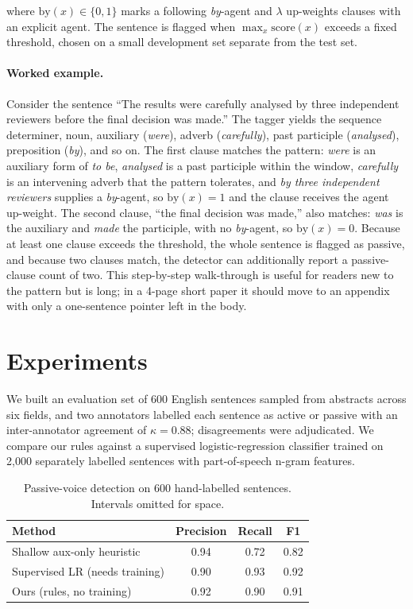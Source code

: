 \documentclass[11pt]{article}
\begin{document}
where $\mathrm{by}(x)\in\{0,1\}$ marks a following \emph{by}-agent and $\lambda$
up-weights clauses with an explicit agent. The sentence is flagged when
$\max_x \mathrm{score}(x)$ exceeds a fixed threshold, chosen on a small
development set separate from the test set.

\paragraph{Worked example.}
Consider the sentence ``The results were carefully analysed by three independent
reviewers before the final decision was made.'' The tagger yields the sequence
determiner, noun, auxiliary (\emph{were}), adverb (\emph{carefully}), past
participle (\emph{analysed}), preposition (\emph{by}), and so on. The first
clause matches the pattern: \emph{were} is an auxiliary form of \emph{to be},
\emph{analysed} is a past participle within the window, \emph{carefully} is an
intervening adverb that the pattern tolerates, and \emph{by three independent
reviewers} supplies a \emph{by}-agent, so $\mathrm{by}(x)=1$ and the clause
receives the agent up-weight. The second clause, ``the final decision was
made,'' also matches: \emph{was} is the auxiliary and \emph{made} the participle,
with no \emph{by}-agent, so $\mathrm{by}(x)=0$. Because at least one clause
exceeds the threshold, the whole sentence is flagged as passive, and because two
clauses match, the detector can additionally report a passive-clause count of
two. This step-by-step walk-through is useful for readers new to the pattern but
is long; in a 4-page short paper it should move to an appendix with only a
one-sentence pointer left in the body.

\section{Experiments}

We built an evaluation set of 600 English sentences sampled from abstracts across
six fields, and two annotators labelled each sentence as active or passive with
an inter-annotator agreement of $\kappa = 0.88$; disagreements were adjudicated.
We compare our rules against a supervised logistic-regression classifier trained
on 2{,}000 separately labelled sentences with part-of-speech n-gram features.

\begin{table}[t]
    \centering
    \begin{tabular}{lccc}
        \toprule
        Method & Precision & Recall & F1 \\
        \midrule
        Shallow aux-only heuristic & 0.94 & 0.72 & 0.82 \\
        Supervised LR (needs training) & 0.90 & 0.93 & 0.92 \\
        Ours (rules, no training) & 0.92 & 0.90 & 0.91 \\
        \bottomrule
    \end{tabular}
    \caption{Passive-voice detection on 600 hand-labelled sentences. Intervals
    omitted for space.}
    \label{tab:results}
\end{table}
\end{document}

